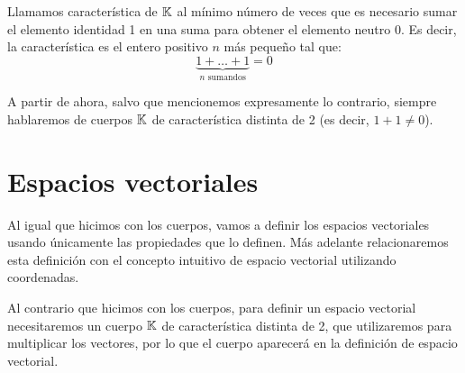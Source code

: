 \documentclass[../algebra_lineal.tex]{subfiles}
\begin{document}
\begin{definition}
    Llamamos característica de $\mathbb{K}$ al mínimo número de veces que es necesario sumar el elemento identidad 1 en una suma para obtener el elemento neutro 0. Es decir, la característica es el entero positivo $n$ más pequeño tal que:
    \[
        \underbrace{1+\dots+1}_{n\, \, \mathrm{sumandos}} = 0
    \]  
\end{definition}

A partir de ahora, salvo que mencionemos expresamente lo contrario, siempre hablaremos de cuerpos $\mathbb{K}$ de característica distinta de 2 (es decir, $1+1 \ne 0$).

\section{Espacios vectoriales}

Al igual que hicimos con los cuerpos, vamos a definir los espacios vectoriales usando únicamente las propiedades que lo definen. Más adelante relacionaremos esta definición con el concepto intuitivo de espacio vectorial utilizando coordenadas.

Al contrario que hicimos con los cuerpos, para definir un espacio vectorial necesitaremos un cuerpo $\mathbb{K}$ de característica distinta de 2, que utilizaremos para multiplicar los vectores, por lo que el cuerpo aparecerá en la definición de espacio vectorial.
\end{document}
